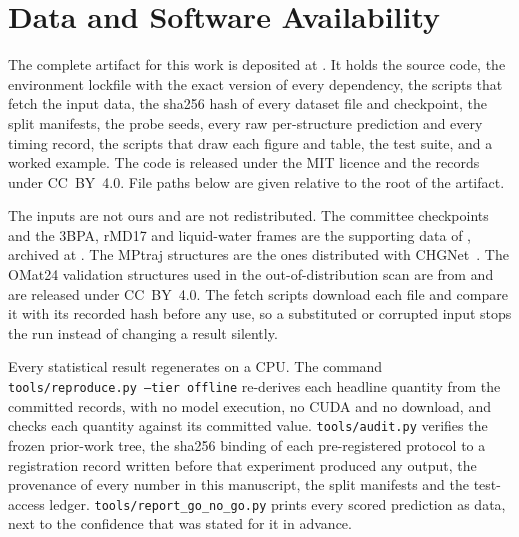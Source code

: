 
\section*{Data and Software Availability}
\label{sec:avail}

The complete artifact for this work is deposited at \fsArtifactLink. It holds
the source code, the environment lockfile with the exact version of every
dependency, the scripts that fetch the input data, the sha256 hash of every
dataset file and checkpoint, the split manifests, the probe seeds, every raw
per-structure prediction and every timing record, the scripts that draw each
figure and table, the test suite, and a worked example. The code is released
under the MIT licence and the records under CC~BY~4.0. File paths below are
given relative to the root of the artifact.

The inputs are not ours and are not redistributed. The committee checkpoints
and the 3BPA, rMD17 and liquid-water frames are the supporting data of
\citet{beck2025committee}, archived at \texttt{\fsUpstreamZenodo}. The MPtraj
structures are the ones distributed with CHGNet~\citep{deng2023chgnet}. The
OMat24 validation structures used in the out-of-distribution scan are from
\citet{barrosoluque2024omat24} and are released under CC~BY~4.0. The fetch
scripts download each file and compare it with its recorded hash before any
use, so a substituted or corrupted input stops the run instead of changing a
result silently.

Every statistical result regenerates on a CPU. The command
\texttt{tools/reproduce.py --tier offline} re-derives each headline quantity
from the committed records, with no model execution, no CUDA and no download,
and checks each quantity against its committed value. \texttt{tools/audit.py}
verifies the frozen prior-work tree, the sha256 binding of each pre-registered
protocol to a registration record written before that experiment produced any
output, the provenance of every number in this manuscript, the split manifests
and the test-access ledger. \texttt{tools/report\_go\_no\_go.py} prints every
scored prediction as data, next to the confidence that was stated for it in
advance.


